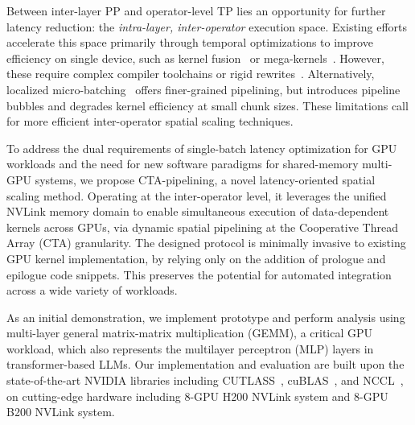 Between inter-layer PP and operator-level TP lies an opportunity for further latency reduction: the \textit{intra-layer, inter-operator} execution space. Existing efforts accelerate this space primarily through temporal optimizations to improve efficiency on single device, such as kernel fusion~\cite{dao2022flashattention} or mega-kernels~\cite{aminabadi2022deepspeed, wu2024mirage,cheng2025mpk}. However, these require complex compiler toolchains or rigid rewrites~\cite{cheng2025mpk}. Alternatively, localized micro-batching~\cite{agrawal2023sarathi, zhong2024distserve} offers finer-grained pipelining, but introduces pipeline bubbles and degrades kernel efficiency at small chunk sizes. These limitations call for more efficient inter-operator spatial scaling techniques.

To address the dual requirements of single-batch latency optimization for GPU workloads and the need for new software paradigms for shared-memory multi-GPU systems, we propose CTA-pipelining, a novel latency-oriented spatial scaling method. Operating at the inter-operator level, it leverages the unified NVLink memory domain to enable simultaneous execution of data-dependent kernels across GPUs, via dynamic spatial pipelining at the Cooperative Thread Array (CTA) granularity. The designed protocol is minimally invasive to existing GPU kernel implementation, by relying only on the addition of prologue and epilogue code snippets. This preserves the potential for automated integration across a wide variety of workloads.


As an initial demonstration, we implement prototype and perform analysis using multi-layer general matrix-matrix multiplication (GEMM), a critical GPU workload, which also represents the multilayer perceptron (MLP) layers in transformer-based LLMs. Our implementation and evaluation are built upon the state-of-the-art NVIDIA libraries including CUTLASS~\cite{cutlass}, cuBLAS~\cite{cublas}, and NCCL~\cite{nccl}, on cutting-edge hardware including 8-GPU H200 NVLink system and 8-GPU B200 NVLink system.

